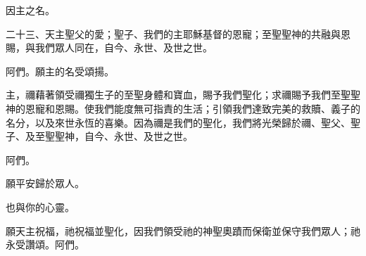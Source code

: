 因主之名。\par

\par

二十三、天主聖父的愛；聖子、我們的主耶穌基督的恩寵；至聖聖神的共融與恩賜，與我們眾人同在，自今、永世、及世之世。\par

\par

阿們。願主的名受頌揚。\par

\par

主，禰藉著領受禰獨生子的至聖身體和寶血，賜予我們聖化；求禰賜予我們至聖聖神的恩寵和恩賜。使我們能度無可指責的生活；引領我們達致完美的救贖、義子的名分，以及來世永恆的喜樂。因為禰是我們的聖化，我們將光榮歸於禰、聖父、聖子、及至聖聖神，自今、永世、及世之世。\par

\par

阿們。\par

\par

願平安歸於眾人。\par

\par

也與你的心靈。\par

\par

願天主祝福，祂祝福並聖化，因我們領受祂的神聖奧蹟而保衛並保守我們眾人；祂永受讚頌。阿們。\par

